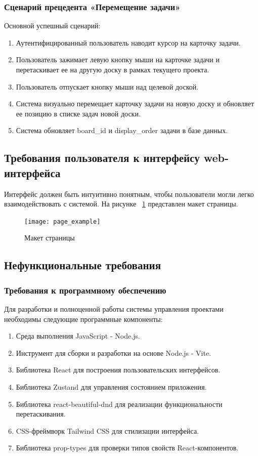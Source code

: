 \subsubsection{Сценарий прецедента «Перемещение задачи»}
Основной успешный сценарий:
\begin{enumerate}
	\item Аутентифицированный пользователь наводит курсор на карточку задачи.
	\item Пользователь зажимает левую кнопку мыши на карточке задачи и перетаскивает ее на другую доску в рамках текущего проекта.
	\item Пользователь отпускает кнопку мыши над целевой доской.
	\item Система визуально перемещает карточку задачи на новую доску и обновляет ее позицию в списке задач новой доски.
	\item Система обновляет board\_id и display\_order задачи в базе данных.
\end{enumerate}

\subsection{Требования пользователя к интерфейсу web-интерфейса}
Интерфейс должен быть интуитивно понятным, чтобы пользователи могли легко взаимодействовать с системой.
На рисунке ~\ref{page_example:image} представлен макет страницы.

\begin{figure}[H]
	\centering
	\texttt{[image: page\_example]}
	\caption{Макет страницы}
	\label{page_example:image}
\end{figure}

\subsection{Нефункциональные требования}

\subsubsection{Требования к программному обеспечению}

Для разработки и полноценной работы системы управления проектами необходимы следующие программные компоненты:

\begin{enumerate}
	\item Среда выполнения JavaScript - Node.js.
	\item Инструмент для сборки и разработки на основе Node.js - Vite.
	\item Библиотека React для построения пользовательских интерфейсов.
	\item Библиотека Zustand для управления состоянием приложения.
	\item Библиотека react-beautiful-dnd для реализации функциональности перетаскивания.
	\item CSS-фреймворк Tailwind CSS для стилизации интерфейса.
	\item Библиотека prop-types для проверки типов свойств React-компонентов.
\end{enumerate}

